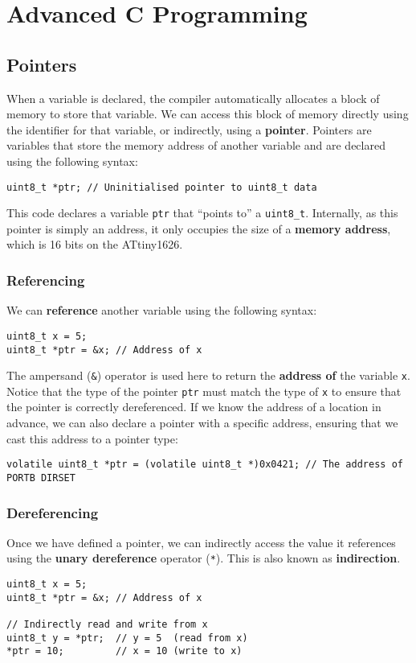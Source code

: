 \documentclass{article}
\begin{document}
\section{Advanced C Programming}
\subsection{Pointers}
When a variable is declared, the compiler automatically allocates a
block of memory to store that variable. We can access this block of
memory directly using the identifier for that variable, or indirectly,
using a \textbf{pointer}. Pointers are variables that store the memory
address of another variable and are declared using the following
syntax:
\begin{verbatim}
uint8_t *ptr; // Uninitialised pointer to uint8_t data
\end{verbatim}
This code declares a variable \texttt{ptr} that ``points to'' a
\texttt{uint8_t}. Internally, as this pointer is simply an
address, it only occupies the size of a \textbf{memory address}, which
is 16 bits on the ATtiny1626.
\subsubsection{Referencing}
We can \textbf{reference} another variable using the following syntax:
\begin{verbatim}
uint8_t x = 5;
uint8_t *ptr = &x; // Address of x
\end{verbatim}
The ampersand (\texttt{&}) operator is used here to return the
\textbf{address of} the variable \texttt{x}. Notice that the
type of the pointer \texttt{ptr} must match the type of
\texttt{x} to ensure that the pointer is correctly dereferenced.
If we know the address of a location in advance, we can also declare a
pointer with a specific address, ensuring that we cast this address to
a pointer type:
\begin{verbatim}
volatile uint8_t *ptr = (volatile uint8_t *)0x0421; // The address of PORTB DIRSET
\end{verbatim}
\subsubsection{Dereferencing}
Once we have defined a pointer, we can indirectly access the value it
references using the \textbf{unary dereference} operator
(\texttt{*}). This is also known as \textbf{indirection}.
\begin{verbatim}
uint8_t x = 5;
uint8_t *ptr = &x; // Address of x

// Indirectly read and write from x
uint8_t y = *ptr;  // y = 5  (read from x)
*ptr = 10;         // x = 10 (write to x)
\end{verbatim}
\end{document}
